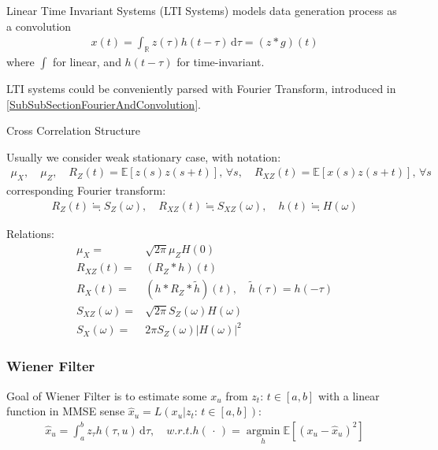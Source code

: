 Linear Time Invariant Systems (LTI Systems) models data generation process as a convolution
\begin{align}
    x(t)=\int _\mathbb{R}z(\tau)h(t-\tau) \,\mathrm{d}\tau = (z*g)(t)
\end{align}
where $ \int $ for linear, and $ h(t-\tau) $ for time-invariant.

LTI systems could be conveniently parsed with Fourier Transform, introduced in \autoref{SubSubSectionFourierAndConvolution}.

\begin{point}
    Cross Correlation Structure
\end{point}

Usually we consider weak stationary case, with notation:
\begin{align}
    \mu _X,\quad \mu _Z,\quad  R_Z(t)=\mathbb{E}\left[ z(s)z(s+t) \right],\,\forall s,\quad R_{XZ}(t)=\mathbb{E}\left[ x(s)z(s+t) \right],\,\forall s  
\end{align}
corresponding Fourier transform:
\begin{align}
    R_Z(t)\fallingdotseq S_Z(\omega ),\quad R_{XZ}(t)\fallingdotseq S_{XZ}(\omega ) ,\quad h(t)\fallingdotseq H(\omega )
\end{align}

Relations:
\begin{align}
    \mu _X=&  \sqrt{2\pi}\mu _ZH(0) \\
    R_{XZ}(t)=&(R_Z*h)(t)\\
    R_{X}(t)=&(h*R_Z*\tilde{h})(t),\quad \tilde{h}(\tau)=h(-\tau)\\
    S_{XZ}(\omega )=&\sqrt{2\pi}S_Z(\omega )H(\omega )\\
    S_X(\omega )=&2\pi S_Z(\omega )|H(\omega )|^2
\end{align}


\subsubsection{Wiener Filter}
Goal of Wiener Filter is to estimate some $ x_u $ from $ z_t:\,t\in[a,b] $ with a linear function in MMSE sense $ \hat{x}_u=L(x_u|z_t:\,t\in[a,b]) $:
\begin{align}
    \hat{x}_u=\int _a^b z_\tau h(\tau,u) \,\mathrm{d}\tau ,\quad w.r.t. h(\, \cdot \, )=\mathop{\arg\min}\limits_{h}\mathbb{E}\left[ (x_u-\hat{x}_u) ^2\right]  
\end{align}


